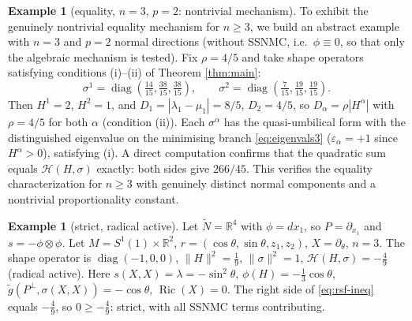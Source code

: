 \documentclass[11pt]{article}
\theoremstyle{definition}
\newtheorem{example}[theorem]{Example}
\newcommand{\tN}{\widetilde{N}}
\newcommand{\tg}{\widetilde{g}}
\newcommand{\Ric}{\operatorname{Ric}}
\newcommand{\HH}{\mathcal{H}}
\begin{document}
\begin{example}[equality, $n=3$, $p=2$: nontrivial mechanism]\label{ex:n3}
To exhibit the genuinely nontrivial equality mechanism for $n\ge3$, we build an abstract example with $n=3$ and $p=2$ normal directions (without SSNMC, i.e.\ $\phi\equiv0$, so that only the algebraic mechanism is tested). Fix $\rho=4/5$ and take shape operators satisfying conditions (i)--(ii) of Theorem \ref{thm:main}:
\[
\sigma^1=\operatorname{diag}\!\left(\tfrac{14}{15},\tfrac{38}{15},\tfrac{38}{15}\right),\qquad
\sigma^2=\operatorname{diag}\!\left(\tfrac{7}{15},\tfrac{19}{15},\tfrac{19}{15}\right).
\]
Then $H^1=2$, $H^2=1$, and $D_1=|\lambda_1-\mu_1|=8/5$, $D_2=4/5$, so $D_\alpha=\rho|H^\alpha|$ with $\rho=4/5$ for both $\alpha$ (condition (ii)). Each $\sigma^\alpha$ has the quasi-umbilical form with the distinguished eigenvalue on the minimising branch \eqref{eq:eigenvals3} ($\varepsilon_\alpha=+1$ since $H^\alpha>0$), satisfying (i). A direct computation confirms that the quadratic sum equals $\HH(H,\sigma)$ exactly: both sides give $266/45$. This verifies the equality characterization for $n\ge3$ with genuinely distinct normal components and a nontrivial proportionality constant.
\end{example}

\begin{example}[strict, radical active]\label{ex:strict}
Let $\tN=\mathbb{R}^4$ with $\phi=dx_1$, so $P=\partial_{x_1}$ and $s=-\phi\otimes\phi$. Let $M=S^1(1)\times\mathbb{R}^2$, $r=(\cos\theta,\sin\theta,z_1,z_2)$, $X=\partial_\theta$, $n=3$. The shape operator is $\operatorname{diag}(-1,0,0)$, $\|H\|^2=\tfrac19$, $\|\sigma\|^2=1$, $\HH(H,\sigma)=-\tfrac49$ (radical active). Here $s(X,X)=\lambda=-\sin^2\theta$, $\phi(H)=-\tfrac13\cos\theta$, $\tg(P^\perp,\sigma(X,X))=-\cos\theta$, $\Ric(X)=0$. The right side of \eqref{eq:rsf-ineq} equals $-\tfrac49$, so $0\ge-\tfrac49$: strict, with all SSNMC terms contributing.
\end{example}
\end{document}
